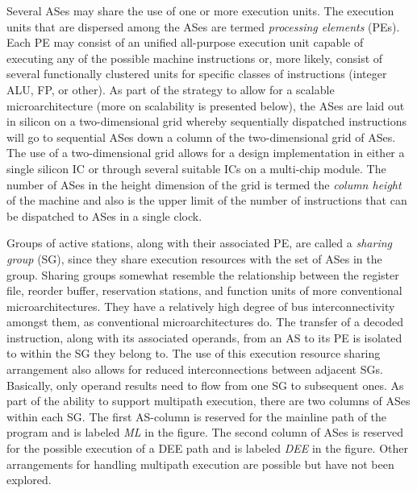 \documentclass{book}
\begin{document}
Several ASes may share the use of one or more execution units.
The execution units that are dispersed among the ASes are termed
\textit{processing elements} (PEs).  Each PE 
may consist of an unified all-purpose execution unit capable of
executing any of the possible machine instructions or, more likely,
consist of
several functionally clustered units
for specific classes of instructions (integer ALU, FP, or other).
As part of the strategy to allow for a scalable microarchitecture
(more on scalability is presented below),
the ASes are laid out in silicon on
a two-dimensional grid whereby sequentially
dispatched instructions will go to sequential ASes down a column of
the two-dimensional grid of ASes.  
The use of a two-dimensional
grid allows for a design implementation
in either a single silicon IC or through several
suitable ICs on a multi-chip module.
The number of ASes in the height dimension of the grid is termed
the \textit{column height} of the machine and also is the upper limit
of the number of instructions that can be dispatched to ASes
in a single clock.

Groups of active stations, along with their associated PE,
are called a \textit{sharing group} (SG), since they share
execution resources with the set of ASes in the group.
Sharing groups somewhat resemble
the relationship between the register file, reorder buffer,
reservation stations, and function units of more conventional
microarchitectures.  They have a relatively high degree of bus
interconnectivity amongst them, as conventional microarchitectures do.
The transfer of a decoded instruction, along with its associated operands,
from an AS to its PE is isolated to within the SG they belong to.
The use of this execution resource sharing arrangement also allows
for reduced interconnections between adjacent SGs.
Basically, only operand results need to flow from one SG
to subsequent ones.
As part of the ability to support multipath execution,
there are two columns of ASes within each SG.
The first AS-column is
reserved for the mainline
path of the program and is
labeled \textit{ML} in the figure.
The second column of ASes is reserved for the possible
execution of a DEE path and is labeled \textit{DEE} in the figure.
Other arrangements for handling multipath execution are possible
but have not been explored.
\end{document}
